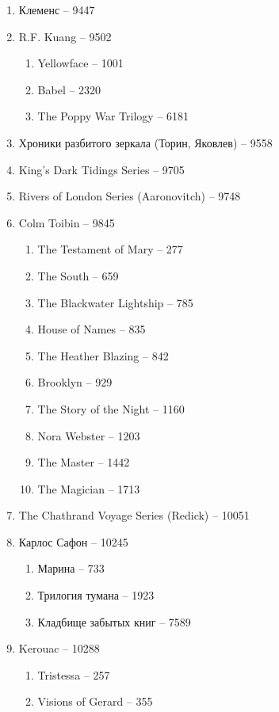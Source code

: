 \documentclass[a4paper, 11pt]{proc} %
\begin{document}
\begin{enumerate}
    \item Клеменс -- 9447
    \item R.F. Kuang -- 9502
        \begin{enumerate}
            \item Yellowface -- 1001
            \item Babel -- 2320
            \item The Poppy War Trilogy -- 6181
        \end{enumerate}
    \item Хроники разбитого зеркала (Торин, Яковлев) -- 9558
    \item King's Dark Tidings Series -- 9705
    \item Rivers of London Series (Aaronovitch) -- 9748
    \item Colm Toibin -- 9845
        \begin{enumerate}
            \item The Testament of Mary -- 277
            \item The South -- 659
            \item The Blackwater Lightship -- 785
            \item House of Names -- 835
            \item The Heather Blazing -- 842
            \item Brooklyn -- 929
            \item The Story of the Night -- 1160
            \item Nora Webster -- 1203
            \item The Master -- 1442
            \item The Magician -- 1713
        \end{enumerate}
    \item The Chathrand Voyage Series (Redick) -- 10051
    \item Карлос Сафон -- 10245
        \begin{enumerate}
            \item Марина -- 733
            \item Трилогия тумана -- 1923
            \item Кладбище забытых книг -- 7589
        \end{enumerate}
    \item Kerouac -- 10288
        \begin{enumerate}
            \item Tristessa -- 257
            \item Visions of Gerard -- 355

\end{enumerate}
\end{enumerate}
\end{document}
